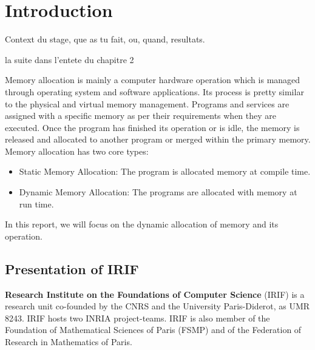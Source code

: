 \section{Introduction}
\label{sec:introduction}

Context du stage, que as tu fait, ou, quand, resultats.

la suite dans l'entete du chapitre 2

Memory allocation is mainly a computer hardware operation which is managed through operating system and software applications. Its process is pretty similar to the physical and virtual memory management. Programs and services are assigned with a specific memory as per their requirements when they are executed. Once the program has finished its operation or is idle, the memory is released and allocated to another program or merged within the primary memory.\\

Memory allocation has two core types:
\begin{itemize}
\item Static Memory Allocation: The program is allocated memory at compile time.
\end{itemize}

\begin{itemize}
\item Dynamic Memory Allocation: The programs are allocated with memory at run time.
\end{itemize}

In this report, we will focus on the dynamic allocation of memory and its operation.


\subsection{Presentation of IRIF}
\textbf{Research Institute on the Foundations of Computer Science }
(IRIF) is a research unit co-founded by the CNRS and the University Paris-Diderot, as UMR 8243. IRIF hosts two INRIA project-teams. IRIF is also member of the Foundation of Mathematical Sciences of Paris (FSMP) and of the Federation of Research in Mathematics of Paris. \\

